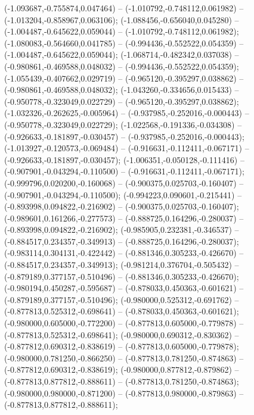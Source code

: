  (-1.093687,-0.755874,0.047464) -- (-1.010792,-0.748112,0.061982) -- (-1.013204,-0.858967,0.063106);
 (-1.088456,-0.656040,0.045280) -- (-1.004487,-0.645622,0.059044) -- (-1.010792,-0.748112,0.061982);
 (-1.080083,-0.564660,0.041785) -- (-0.994436,-0.552522,0.054359) -- (-1.004487,-0.645622,0.059044);
 (-1.068714,-0.482342,0.037038) -- (-0.980861,-0.469588,0.048032) -- (-0.994436,-0.552522,0.054359);
 (-1.055439,-0.407662,0.029719) -- (-0.965120,-0.395297,0.038862) -- (-0.980861,-0.469588,0.048032);
 (-1.043260,-0.334656,0.015433) -- (-0.950778,-0.323049,0.022729) -- (-0.965120,-0.395297,0.038862);
 (-1.032326,-0.262625,-0.005964) -- (-0.937985,-0.252016,-0.000443) -- (-0.950778,-0.323049,0.022729);
 (-1.022568,-0.191336,-0.034308) -- (-0.926633,-0.181897,-0.030457) -- (-0.937985,-0.252016,-0.000443);
 (-1.013927,-0.120573,-0.069484) -- (-0.916631,-0.112411,-0.067171) -- (-0.926633,-0.181897,-0.030457);
 (-1.006351,-0.050128,-0.111416) -- (-0.907901,-0.043294,-0.110500) -- (-0.916631,-0.112411,-0.067171);
 (-0.999796,0.020200,-0.160068) -- (-0.900375,0.025703,-0.160407) -- (-0.907901,-0.043294,-0.110500);
 (-0.994223,0.090601,-0.215441) -- (-0.893998,0.094822,-0.216902) -- (-0.900375,0.025703,-0.160407);
 (-0.989601,0.161266,-0.277573) -- (-0.888725,0.164296,-0.280037) -- (-0.893998,0.094822,-0.216902);
 (-0.985905,0.232381,-0.346537) -- (-0.884517,0.234357,-0.349913) -- (-0.888725,0.164296,-0.280037);
 (-0.983114,0.304131,-0.422442) -- (-0.881346,0.305233,-0.426670) -- (-0.884517,0.234357,-0.349913);
 (-0.981214,0.376704,-0.505432) -- (-0.879189,0.377157,-0.510496) -- (-0.881346,0.305233,-0.426670);
 (-0.980194,0.450287,-0.595687) -- (-0.878033,0.450363,-0.601621) -- (-0.879189,0.377157,-0.510496);
 (-0.980000,0.525312,-0.691762) -- (-0.877813,0.525312,-0.698641) -- (-0.878033,0.450363,-0.601621);
 (-0.980000,0.605000,-0.772200) -- (-0.877813,0.605000,-0.779878) -- (-0.877813,0.525312,-0.698641);
 (-0.980000,0.690312,-0.830362) -- (-0.877812,0.690312,-0.838619) -- (-0.877813,0.605000,-0.779878);
 (-0.980000,0.781250,-0.866250) -- (-0.877813,0.781250,-0.874863) -- (-0.877812,0.690312,-0.838619);
 (-0.980000,0.877812,-0.879862) -- (-0.877813,0.877812,-0.888611) -- (-0.877813,0.781250,-0.874863);
 (-0.980000,0.980000,-0.871200) -- (-0.877813,0.980000,-0.879863) -- (-0.877813,0.877812,-0.888611);
